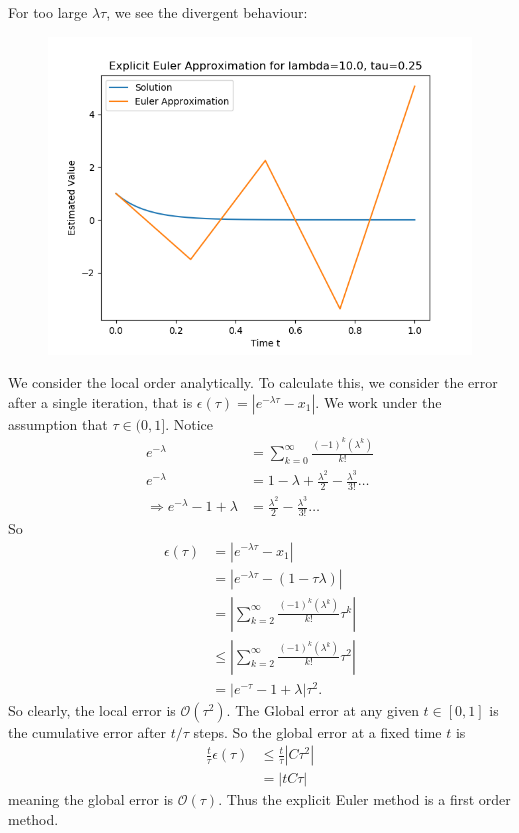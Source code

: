 \documentclass{article}
\begin{document}
\begin{itemize}
		For too large $\lambda \tau$, we see the divergent behaviour:
		\begin{figure}[H]
			\includegraphics[scale=0.6]{graph1a_10_025}
		\end{figure}

		We consider the local order analytically.  To calculate this, we
		consider the
		error after a single iteration, that is $\epsilon(\tau) =
		|e^{-\lambda \tau} - x_1|$.  We work under the assumption that
		$\tau \in (0,1]$.  Notice
		\begin{align*}
			e^{- \lambda} &= \sum_{k=0}^{\infty}
			\frac{(-1)^k(\lambda^k)}{k!} \\
			e^{- \lambda} &= 1 - \lambda + \frac{\lambda^2}{2}
			- \frac{\lambda^3}{3!} \ldots \\
			\Rightarrow  e^{-\lambda} - 1 + \lambda &=
			\frac{\lambda^2}{2} - \frac{\lambda^3}{3!} \ldots
		\end{align*}
		So
		\begin{align*}
			\epsilon(\tau) &= |e^{-\lambda \tau} - x_1| \\
			&= |e^{-\lambda \tau} - (1 - \tau \lambda)| \\
			&= |\sum_{k=2}^{\infty} \frac{(-1)^k(\lambda^k)}{k!}
			\tau^k | \\
			&\leq | \sum_{k=2}^{\infty} \frac{(-1)^k(\lambda^k)}{k!}
			\tau^2 | \\
			&= |e^{-\tau} - 1 + \lambda|\tau^2.
		\end{align*}
		So clearly, the local error is $\mathcal{O}(\tau^2)$. The Global
		error at any given $t \in [0,1]$ is the cumulative error after
		$t / \tau$ steps. So the global error at a fixed time $t$ is
		\begin{align*}
			\frac{t}{\tau}\epsilon(\tau) &\leq \frac{t}{\tau} |C
			\tau^2| \\
			&= |t C \tau|
		\end{align*}
		meaning the global error is $\mathcal{O}(\tau)$. Thus the
		explicit Euler method is a first order method.


\end{itemize}
\end{document}
